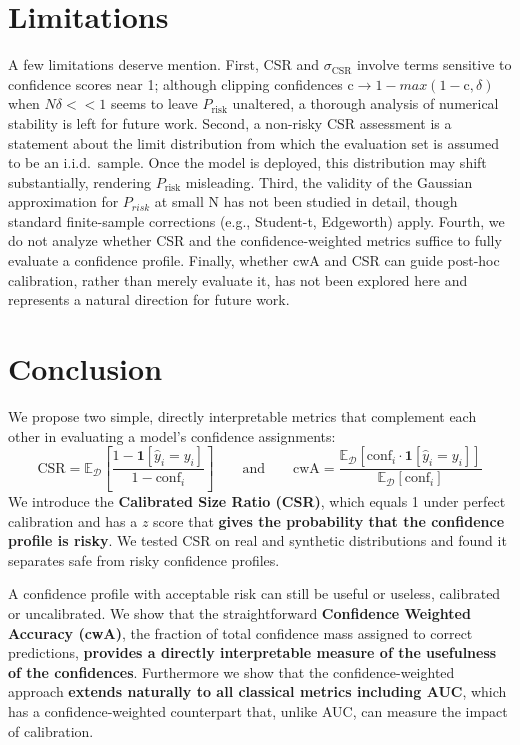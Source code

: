\documentclass{article}
\theoremstyle{plain}
\theoremstyle{definition}
\theoremstyle{remark}
\begin{document}
\section{Limitations}

A few limitations deserve mention. First, CSR and $\sigma_{\mathrm{CSR}}$ involve terms sensitive to confidence scores near 1; although clipping confidences $\text{c} \rightarrow 1 - max(1 - \text{c}, \delta)$ when $N\delta  << 1$ seems to leave $P_{\mathrm{risk}}$ unaltered, a thorough analysis of numerical stability  is left for future work. Second, a non-risky CSR assessment is a statement about the limit distribution from which the evaluation set is assumed to be an i.i.d.\ sample. Once the model is deployed, this distribution may shift substantially, rendering $P_{\mathrm{risk}}$ misleading. Third, the validity of the Gaussian approximation for $P_{risk}$ at small N has not been studied in detail, though standard finite-sample corrections (e.g., Student-t, Edgeworth) apply. Fourth, we do not analyze whether CSR and the confidence-weighted metrics suffice to fully evaluate a confidence profile. Finally, whether cwA and CSR can guide post-hoc calibration, rather than merely evaluate it, has not been explored here and represents a natural direction for future work.



\section{Conclusion}

We propose two simple, directly interpretable metrics that complement each other in evaluating a model's confidence assignments: \[
 \text{CSR} = \mathbb{E}_{\mathcal{D}}\left[\frac{1-\mathbf{1}[\hat{y}_i=y_i]}{1-\text{conf}_i}\right] \quad \quad \text{and} \quad \quad \text{cwA} = \frac{\mathbb{E}_{\mathcal{D}}[\text{conf}_i \cdot \mathbf{1}[\hat{y}_i = y_i]]}{\mathbb{E}_{\mathcal{D}}[\text{conf}_i]}
\]
We introduce the {\bf{Calibrated Size Ratio (CSR)}}, which equals 1 under perfect calibration and has a $z$ score that {\bf{gives the probability that the confidence profile is risky}}. We tested CSR on real and synthetic distributions and found it separates safe from risky confidence profiles.

A confidence profile with acceptable risk can still be useful or useless, calibrated or uncalibrated. We show that the straightforward {\bf{Confidence Weighted Accuracy (cwA)}}, the fraction of total confidence mass assigned to correct predictions, {\bf{provides a directly interpretable measure of the usefulness of the confidences}}. Furthermore we show that the confidence-weighted approach  {\bf{extends naturally to all classical metrics including AUC}}, which has a confidence‑weighted counterpart that, unlike AUC, can measure the impact of calibration.
\end{document}
